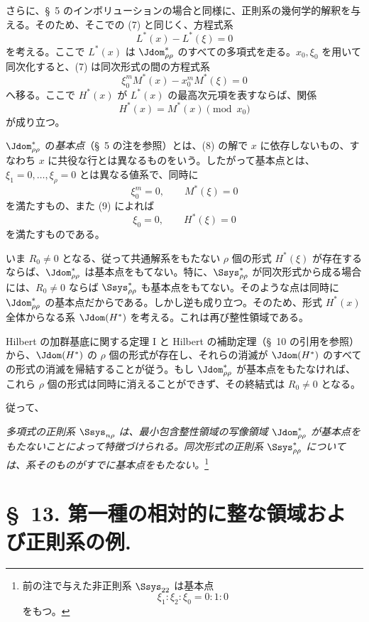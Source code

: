 \documentclass[11pt]{article}
\begin{document}
さらに、\S\ 5 のインボリューションの場合と同様に、正則系の幾何学的解釈を与える。そのため、そこでの (7) と同じく、方程式系
\begin{equation}
  L^*(x)-L^*(\xi)=0
\tag{7}
\end{equation}
を考える。ここで $L^*(x)$ は $\Jdom^*_{\rho\rho}$ のすべての多項式を走る。$x_0,\xi_0$ を用いて同次化すると、(7) は同次形式の間の方程式系
\begin{equation}
  \xi_0^{m}M^*(x)-x_0^{m}M^*(\xi)=0
\tag{8}
\end{equation}
へ移る。ここで $H^*(x)$ が $L^*(x)$ の最高次元項を表すならば、関係
\begin{equation}
  H^*(x)=M^*(x)\pmod{x_0}
\tag{9}
\end{equation}
が成り立つ。

$\Jdom^*_{\rho\rho}$ の\emph{基本点}（\S\ 5 の注を参照）とは、(8) の解で $x$ に依存しないもの、すなわち $x$ に共役な行とは異なるものをいう。したがって基本点とは、$\xi_1=0,\ldots,\xi_\rho=0$ とは異なる値系で、同時に
\[
  \xi_0^m=0,
  \qquad M^*(\xi)=0
\]
を満たすもの、また (9) によれば
\[
  \xi_0=0,
  \qquad H^*(\xi)=0
\]
を満たすものである。

いま $R_0\ne0$ となる、従って共通解系をもたない $\rho$ 個の形式 $H^*(\xi)$ が存在するならば、$\Jdom^*_{\rho\rho}$ は基本点をもてない。特に、$\Ssys^*_{\rho\rho}$ が同次形式から成る場合には、$R_0\ne0$ ならば $\Ssys^*_{\rho\rho}$ も基本点をもてない。そのような点は同時に $\Jdom^*_{\rho\rho}$ の基本点だからである。しかし逆も成り立つ。そのため、形式 $H^*(x)$ 全体からなる系 $\Jdom(H^*)$ を考える。これは再び整性領域である。

Hilbert の加群基底に関する定理 I と Hilbert の補助定理（\S\ 10 の引用を参照）から、$\Jdom(H^*)$ の $\rho$ 個の形式が存在し、それらの消滅が $\Jdom(H^*)$ のすべての形式の消滅を帰結することが従う。もし $\Jdom^*_{\rho\rho}$ が基本点をもたなければ、これら $\rho$ 個の形式は同時に消えることができず、その終結式は $R_0\ne0$ となる。

従って、

\emph{多項式の正則系 $\Ssys_{n\rho}$ は、最小包含整性領域の写像領域 $\Jdom^*_{\rho\rho}$ が基本点をもたないことによって特徴づけられる。同次形式の正則系 $\Ssys^*_{\rho\rho}$ については、系そのものがすでに基本点をもたない。}\footnote{前の注で与えた非正則系 $\Ssys_{22}$ は基本点
\[
  \xi_1:\xi_2:\xi_0=0:1:0
\]
をもつ。}

\section*{\S\ 13. 第一種の相対的に整な領域および正則系の例.}
\end{document}
